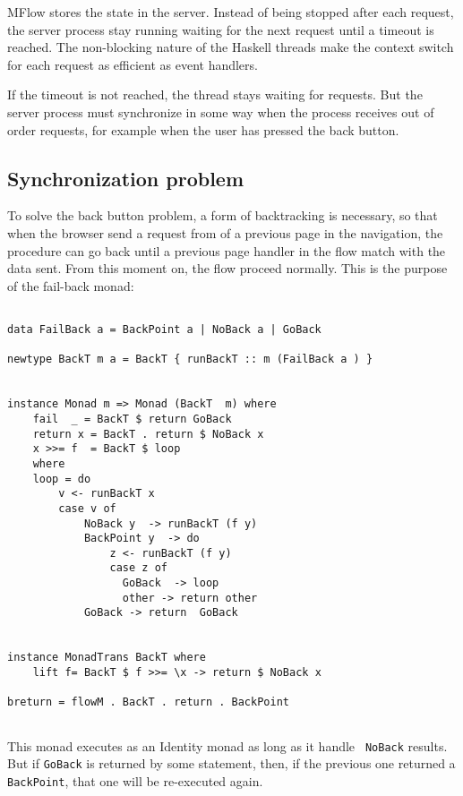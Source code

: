 \documentclass{tmr}
\begin{document}
MFlow stores the state in the server. Instead of being stopped after each request, the server process stay running waiting for the next request until a timeout is reached. The non-blocking nature of the Haskell threads make the context switch for each request as efficient as event handlers. 

If the timeout is not reached, the thread stays waiting for requests. But the server process must synchronize in some way when the process receives out of order requests, for example when the user has pressed the back button. 
 
\subsection{Synchronization problem} 
To solve the back button problem, a form of backtracking is necessary, so that when the browser send a request from of a previous page in the navigation, the procedure can go back until a previous page handler in the flow match with the data sent. From this moment on, the flow proceed normally. This is the purpose of the fail-back monad: 
 
{\tt 
 
\begin{verbatim} 
 
data FailBack a = BackPoint a | NoBack a | GoBack 
 
newtype BackT m a = BackT { runBackT :: m (FailBack a ) } 
 
 
instance Monad m => Monad (BackT  m) where 
    fail  _ = BackT $ return GoBack 
    return x = BackT . return $ NoBack x 
    x >>= f  = BackT $ loop 
    where 
    loop = do 
        v <- runBackT x 
        case v of 
            NoBack y  -> runBackT (f y) 
            BackPoint y  -> do 
                z <- runBackT (f y) 
                case z of 
                  GoBack  -> loop 
                  other -> return other 
            GoBack -> return  GoBack 
 
 
instance MonadTrans BackT where 
    lift f= BackT $ f >>= \x -> return $ NoBack x 
 
breturn = flowM . BackT . return . BackPoint 
 
\end{verbatim} 
 
} 
 
This monad executes as an Identity monad as long as it handle {\tt 
NoBack} results. But if {\tt GoBack} is returned by some statement, then, if the previous one returned a {\tt BackPoint}, that one will be re-executed again. 
\end{document}
